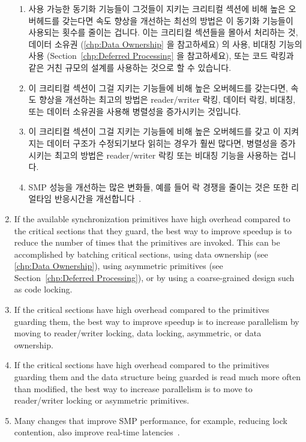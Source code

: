 \begin{enumerate}
\begin{enumerate}
\item	사용 가능한 동기화 기능들이 그것들이 지키는 크리티컬 섹션에 비해 높은
	오버헤드를 갖는다면 속도 향상을 개선하는 최선의 방법은 이 동기화
	기능들이 사용되는 횟수를 줄이는 겁니다.
	이는 크리티컬 섹션들을 몰아서 처리하는 것, 데이터 소유권
	(\cref{chp:Data Ownership} 을 참고하세요) 의 사용, 비대칭 기능의 사용
	(Section~\ref{chp:Deferred Processing} 을 참고하세요),
	또는 코드 락킹과 같은 거친 규모의 설계를 사용하는 것으로 할 수 있습니다.
\item	이 크리티컬 섹션이 그걸 지키는 기능들에 비해 높은 오버헤드를 갖는다면,
	속도 향상을 개선하는 최고의 방법은 reader/writer 락킹, 데이터 락킹,
	비대칭, 또는 데이터 소유권을 사용해 병렬성을 증가시키는 것입니다.
\item	이 크리티컬 섹션이 그걸 지키는 기능들에 비해 높은 오버헤드를 갖고 이
	지켜지는 데이터 구조가 수정되기보다 읽히는 경우가 훨씬 많다면, 병렬성을
	증가시키는 최고의 방법은 reader/writer 락킹 또는 비대칭 기능을 사용하는
	겁니다.
\item	SMP 성능을 개선하는 많은 변화들, 예를 들어 락 경쟁을 줄이는 것은 또한
	리얼타임 반응시간을 개선합니다~\cite{PaulMcKenney2005h}.
\end{enumerate}

\iffalse

\item	If the available synchronization primitives have
	high overhead compared to the critical sections
	that they guard, the best way to improve speedup
	is to reduce the number of times that the primitives
	are invoked.
	This can be accomplished by batching critical sections,
	using data ownership (see \cref{chp:Data Ownership}),
	using asymmetric primitives
	(see Section~\ref{chp:Deferred Processing}),
	or by using a coarse-grained design such as code locking.
\item	If the critical sections have high overhead compared
	to the primitives guarding them, the best way
	to improve speedup is to increase parallelism
	by moving to reader/writer locking, data locking, asymmetric,
	or data ownership.
\item	If the critical sections have high overhead compared
	to the primitives guarding them and the data structure
	being guarded is read much more often than modified,
	the best way to increase parallelism is to move
	to reader/writer locking or asymmetric primitives.
\item	Many changes that improve SMP performance, for example,
	reducing lock contention, also improve real-time
	latencies~\cite{PaulMcKenney2005h}.
\end{enumerate}

